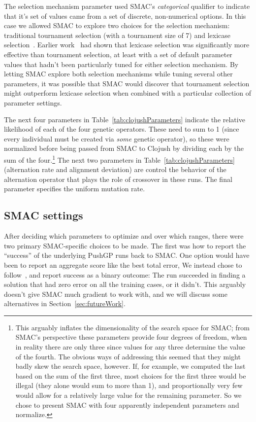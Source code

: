 The selection mechanism parameter used SMAC's \emph{categorical} qualifier to
indicate that it's set of values came from a set of discrete, non-numerical
options. In this case we allowed SMAC to explore two choices for the selection
mechanism: traditional tournament selection (with a tournament size of 7) and
lexicase selection~\cite{Helmuth:2014:ieeeTEC, Spector:2012:GECCOcompANEW}. Earlier 
work~\cite{Helmuth:2015:GECCO} had shown that lexicase selection was
significantly more effective than tournament selection, at least with a set of 
default parameter values that hadn't been particularly tuned for either
selection mechanism. By letting SMAC explore both selection mechanisms while
tuning several other parameters, it was possible that SMAC would discover
that tournament selection might outperform lexicase selection when combined
with a particular collection of parameter settings.

The next four parameters in Table~\ref{tab:clojushParameters} indicate the
relative likelihood of each of the four genetic operators. These need to sum
to 1 (since every individual must be created via \emph{some} genetic operator),
so these were normalized before being passed from SMAC to Clojush by dividing
each by the sum of the four.\footnote{This arguably inflates the dimensionality of the
search space for SMAC; from SMAC's perspective these parameters provide four
degrees of freedom, when in reality there are only three since values for any
three determine the value of the fourth. The obvious ways of addressing this
seemed that they might badly skew the search space, however. If, for example,
we computed the last based on the sum of the first three, most choices for the
first three would be illegal (they alone would sum to more than 1), and
proportionally very few would allow for a relatively large value for the
remaining parameter. So we chose to present SMAC with four apparently 
independent parameters and normalize.} The next two parameters in Table~\ref{tab:clojushParameters} (alternation
rate and alignment deviation) are control the behavior of the alternation
operator that plays the role of crossover in these runs. The final parameter
specifies the uniform mutation rate.

\subsection{SMAC settings}
\label{sec:SMACsettings}

After deciding which parameters to optimize and over which ranges, there 
were two primary SMAC-specific choices to be made. The first was how to
report the ``success'' of the underlying PushGP runs back to SMAC. One
option would have been to report an aggregate score like the best total error,
We instead chose to 
follow~\cite{Helmuth:2015:GECCO,Helmuth:2014:ieeeTEC}, and report
success as a binary outcome: The run succeeded in finding a solution that
had zero error on all the training cases, or it didn't. This arguably doesn't
give SMAC much gradient to work with, and we will discuss some alternatives
in Section~\ref{sec:futureWork}.

